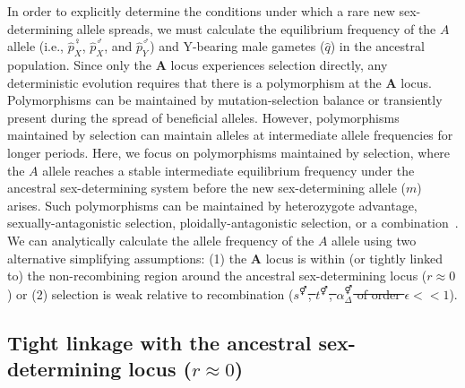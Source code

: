 \documentclass[10pt,letterpaper]{article}
\providecommand{\DIFaddtex}[1]{{\protect\color{blue}\uwave{#1}}} %
\providecommand{\DIFdeltex}[1]{{\protect\color{red}\sout{#1}}}                      %
\providecommand{\DIFaddbegin}{} %
\providecommand{\DIFaddend}{} %
\providecommand{\DIFdelbegin}{} %
\providecommand{\DIFdelend}{} %
\providecommand{\DIFadd}[1]{\texorpdfstring{\DIFaddtex{#1}}{#1}} %
\providecommand{\DIFdel}[1]{\texorpdfstring{\DIFdeltex{#1}}{}} %
\begin{document}
In order to explicitly determine the conditions under which a rare new sex-determining allele spreads, we must calculate the equilibrium frequency of the $A$ allele (i.e., $\hat{p}^\female_X$, $\hat{p}^\male_X$, and $\hat{p}^\male_Y$) and Y-bearing male gametes ($\hat{q}$) in the ancestral population. 
Since only the $\mathbf{A}$ locus experiences selection directly, any deterministic evolution requires that there is a polymorphism at the $\mathbf{A}$ locus. 
Polymorphisms can be maintained by mutation-selection balance or transiently present during the spread of beneficial alleles. 
However, polymorphisms maintained by selection can maintain alleles at intermediate allele frequencies for longer periods. 
Here, we focus on polymorphisms maintained by selection, where the $A$ allele reaches a stable intermediate equilibrium frequency under the ancestral sex-determining system before the new sex-determining allele ($m$) arises. 
Such polymorphisms can be maintained by heterozygote advantage, sexually-antagonistic selection, ploidally-antagonistic selection, or a combination~\cite{Immler:2012tl}.
We can analytically calculate the allele frequency of the $A$ allele using two alternative simplifying assumptions: 
(1) the $\mathbf{A}$ locus is within (or tightly linked to) the non-recombining region around the ancestral sex-determining locus ($r \approx 0$) or (2) selection is weak relative to recombination (\DIFdelbegin \DIFdel{$s^\Hermaphrodite$, $t^\Hermaphrodite$, $\alpha_{\Delta}^\Hermaphrodite$ of order $\epsilon<<1$}\DIFdelend \DIFaddbegin \DIFadd{$s^\circ$, $t^\circ$, $\alpha_{\Delta}^\circ$ $<<$ $r$}\DIFaddend ). 

\DIFaddbegin 

\DIFaddend \subsection*{Tight linkage with the ancestral sex-determining locus ($r \approx 0$)}
\end{document}
